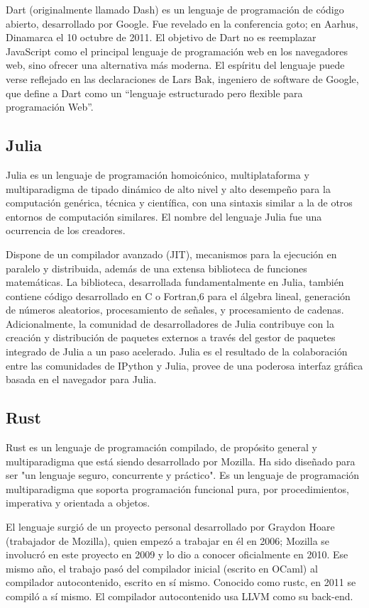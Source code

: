 \documentclass[twoside,twocolumn]{article}
\begin{document}
Dart (originalmente llamado Dash) es un lenguaje de programación de código abierto, desarrollado por Google. Fue revelado en la conferencia goto; en Aarhus, Dinamarca el 10 octubre de 2011. El objetivo de Dart no es reemplazar JavaScript como el principal lenguaje de programación web en los navegadores web, sino ofrecer una alternativa más moderna. El espíritu del lenguaje puede verse reflejado en las declaraciones de Lars Bak, ingeniero de software de Google, que define a Dart como un “lenguaje estructurado pero flexible para programación Web”.

\subsection{Julia}

Julia es un lenguaje de programación homoicónico, multiplataforma y multiparadigma de tipado dinámico de alto nivel y alto desempeño para la computación genérica, técnica y científica, con una sintaxis similar a la de otros entornos de computación similares. El nombre del lenguaje Julia fue una ocurrencia de los creadores.

Dispone de un compilador avanzado (JIT), mecanismos para la ejecución en paralelo y distribuida, además de una extensa biblioteca de funciones matemáticas. La biblioteca, desarrollada fundamentalmente en Julia, también contiene código desarrollado en C o Fortran,6 para el álgebra lineal, generación de números aleatorios, procesamiento de señales, y procesamiento de cadenas. Adicionalmente, la comunidad de desarrolladores de Julia contribuye con la creación y distribución de paquetes externos a través del gestor de paquetes integrado de Julia a un paso acelerado. Julia es el resultado de la colaboración entre las comunidades de IPython y Julia, provee de una poderosa interfaz gráfica basada en el navegador para Julia. 

\subsection{Rust}

Rust es un lenguaje de programación compilado, de propósito general y multiparadigma que está siendo desarrollado por Mozilla. Ha sido diseñado para ser "un lenguaje seguro, concurrente y práctico". Es un lenguaje de programación multiparadigma que soporta programación funcional pura, por procedimientos, imperativa y orientada a objetos.

El lenguaje surgió de un proyecto personal desarrollado por Graydon Hoare (trabajador de Mozilla), quien empezó a trabajar en él en 2006; Mozilla se involucró en este proyecto en 2009 y lo dio a conocer oficialmente en 2010. Ese mismo año, el trabajo pasó del compilador inicial (escrito en OCaml) al compilador autocontenido, escrito en sí mismo. Conocido como rustc, en 2011 se compiló a sí mismo. El compilador autocontenido usa LLVM como su back-end.
\end{document}
